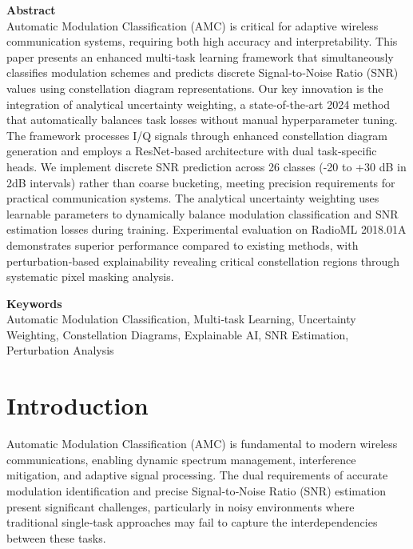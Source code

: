 \documentclass{ELSP}
\begin{document}
\vspace{0.5em}
\noindent\textbf{\textcolor[RGB]{0,131,255}{Abstract}}\\
Automatic Modulation Classification (AMC) is critical for adaptive wireless communication systems, requiring both high accuracy and interpretability. This paper presents an enhanced multi‑task learning framework that simultaneously classifies modulation schemes and predicts discrete Signal‑to‑Noise Ratio (SNR) values using constellation diagram representations. Our key innovation is the integration of analytical uncertainty weighting, a state‑of‑the‑art 2024 method that automatically balances task losses without manual hyperparameter tuning. The framework processes I/Q signals through enhanced constellation diagram generation and employs a ResNet‑based architecture with dual task‑specific heads. We implement discrete SNR prediction across 26 classes (-20 to +30 dB in 2dB intervals) rather than coarse bucketing, meeting precision requirements for practical communication systems. The analytical uncertainty weighting uses learnable parameters to dynamically balance modulation classification and SNR estimation losses during training. Experimental evaluation on RadioML 2018.01A demonstrates superior performance compared to existing methods, with perturbation‑based explainability revealing critical constellation regions through systematic pixel masking analysis.

\vspace{0.5em}
\noindent\textbf{\textcolor[RGB]{0,131,255}{Keywords}}\\
Automatic Modulation Classification, Multi‑task Learning, Uncertainty Weighting, Constellation Diagrams, Explainable AI, SNR Estimation, Perturbation Analysis

\section{Introduction}

Automatic Modulation Classification (AMC) \cite{huynh2021automatic} is fundamental to modern wireless communications, enabling dynamic spectrum management, interference mitigation, and adaptive signal processing. The dual requirements of accurate modulation identification and precise Signal‑to‑Noise Ratio (SNR) estimation present significant challenges, particularly in noisy environments where traditional single‑task approaches may fail to capture the interdependencies between these tasks.
\end{document}
